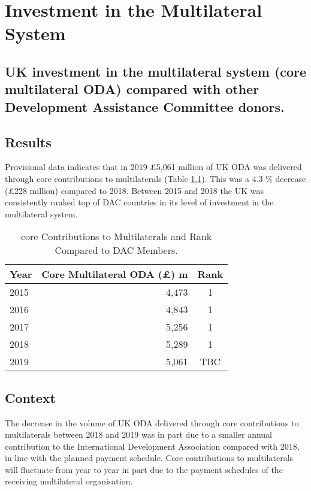 \chapter{Investment in the Multilateral System}

\section*{UK investment in the multilateral system (core multilateral ODA) compared with other Development Assistance Committee donors.}

\bigskip
\bigskip

\thispagestyle{empty}


\section{Results}

Provisional data indicates that in 2019 \pounds 5,061 million of UK ODA was delivered through core contributions to multilaterals (Table \ref{tab:multi_rank}). %
This was a 4.3 \% decrease (\pounds 228 million) compared to 2018. %
Between 2015 and 2018 the UK was consistently ranked top of DAC countries in its level of investment in the multilateral system. %


 
\begin{table}[htbp]
  \centering
  \caption{core Contributions to Multilaterals and Rank Compared to DAC Members.}\label{tab:multi_rank}
  \begin{tabular}{lrc}
  \toprule
  \multicolumn{1}{c}{Year} & \multicolumn{1}{c}{Core Multilateral ODA (\pounds) m} & \multicolumn{1}{c}{Rank} \\ \hline
  \rule{0pt}{10pt}2015 & 4,473 & 1 \\
  2016 & 4,843 & 1 \\
  2017 & 5,256 & 1 \\
  2018 & 5,289 & 1 \\ 
  2019 & 5,061 & TBC\footnotemark \\
  \bottomrule
  \end{tabular}
\end{table}




\section{Context}
The decrease in the volume of UK ODA delivered through core contributions to multilaterals between 2018 and 2019 was in part due to a smaller annual contribution to the International Development Association compared with 2018, in line with the planned payment schedule. %
Core contributions to multilaterals will fluctuate from year to year in part due to the payment schedules of the receiving multilateral organisation. %


\newpage
